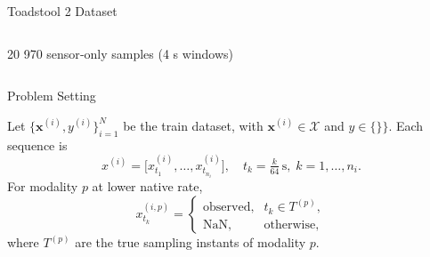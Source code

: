 \begin{frame}{Toadstool 2 Dataset}
\begin{columns}[T]
\begin{column}{0.5\textwidth}
		\begin{block}{}
			20 970 sensor‐only samples (4 s windows)
		\end{block}

		\end{column}
		
	\end{columns}
\end{frame}


\begin{frame}[t]{Problem Setting}

	\begin{block}{}
		Let $\{\boldsymbol{x}^{(i)}, y^(i)\}_{i=1}^{N}$ be the train dataset, with $\boldsymbol{x}^{(i)}\in\mathcal{X}$ and $y \in \{\}\}$.  Each sequence is
		\[
		x^{(i)}
		=\bigl[x^{(i)}_{t_{1}},\dots,x^{(i)}_{t_{n_i}}\bigr],
		\quad t_k = \tfrac{k}{64}\,\mathrm{s},\;k=1,\dots,n_i.
		\]
		For modality $p$ at lower native rate,
		\[
		x^{(i,p)}_{t_k} =
		\begin{cases}
			\text{observed}, & t_k\in T^{(p)},\\
			\mathrm{NaN},    & \text{otherwise},
		\end{cases}
		\]
		where $T^{(p)}$ are the true sampling instants of modality $p$.
	\end{block}
\end{frame}
